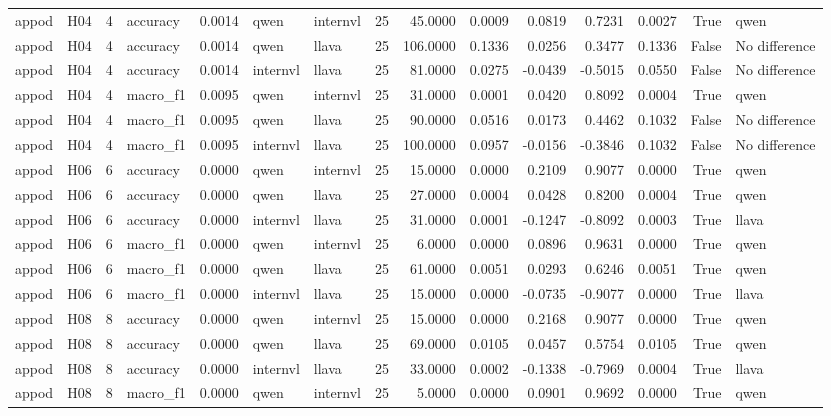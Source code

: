 \begin{table}[tbp]
\begin{tabular}{llrlrllrrrrrrrl}
appod & H04 & 4 & accuracy & 0.0014 & qwen & internvl & 25 & 45.0000 & 0.0009 & 0.0819 & 0.7231 & 0.0027 & True & qwen \\
appod & H04 & 4 & accuracy & 0.0014 & qwen & llava & 25 & 106.0000 & 0.1336 & 0.0256 & 0.3477 & 0.1336 & False & No difference \\
appod & H04 & 4 & accuracy & 0.0014 & internvl & llava & 25 & 81.0000 & 0.0275 & -0.0439 & -0.5015 & 0.0550 & False & No difference \\
appod & H04 & 4 & macro\_f1 & 0.0095 & qwen & internvl & 25 & 31.0000 & 0.0001 & 0.0420 & 0.8092 & 0.0004 & True & qwen \\
appod & H04 & 4 & macro\_f1 & 0.0095 & qwen & llava & 25 & 90.0000 & 0.0516 & 0.0173 & 0.4462 & 0.1032 & False & No difference \\
appod & H04 & 4 & macro\_f1 & 0.0095 & internvl & llava & 25 & 100.0000 & 0.0957 & -0.0156 & -0.3846 & 0.1032 & False & No difference \\
appod & H06 & 6 & accuracy & 0.0000 & qwen & internvl & 25 & 15.0000 & 0.0000 & 0.2109 & 0.9077 & 0.0000 & True & qwen \\
appod & H06 & 6 & accuracy & 0.0000 & qwen & llava & 25 & 27.0000 & 0.0004 & 0.0428 & 0.8200 & 0.0004 & True & qwen \\
appod & H06 & 6 & accuracy & 0.0000 & internvl & llava & 25 & 31.0000 & 0.0001 & -0.1247 & -0.8092 & 0.0003 & True & llava \\
appod & H06 & 6 & macro\_f1 & 0.0000 & qwen & internvl & 25 & 6.0000 & 0.0000 & 0.0896 & 0.9631 & 0.0000 & True & qwen \\
appod & H06 & 6 & macro\_f1 & 0.0000 & qwen & llava & 25 & 61.0000 & 0.0051 & 0.0293 & 0.6246 & 0.0051 & True & qwen \\
appod & H06 & 6 & macro\_f1 & 0.0000 & internvl & llava & 25 & 15.0000 & 0.0000 & -0.0735 & -0.9077 & 0.0000 & True & llava \\
appod & H08 & 8 & accuracy & 0.0000 & qwen & internvl & 25 & 15.0000 & 0.0000 & 0.2168 & 0.9077 & 0.0000 & True & qwen \\
appod & H08 & 8 & accuracy & 0.0000 & qwen & llava & 25 & 69.0000 & 0.0105 & 0.0457 & 0.5754 & 0.0105 & True & qwen \\
appod & H08 & 8 & accuracy & 0.0000 & internvl & llava & 25 & 33.0000 & 0.0002 & -0.1338 & -0.7969 & 0.0004 & True & llava \\
appod & H08 & 8 & macro\_f1 & 0.0000 & qwen & internvl & 25 & 5.0000 & 0.0000 & 0.0901 & 0.9692 & 0.0000 & True & qwen \\

\end{tabular}
\end{table}
